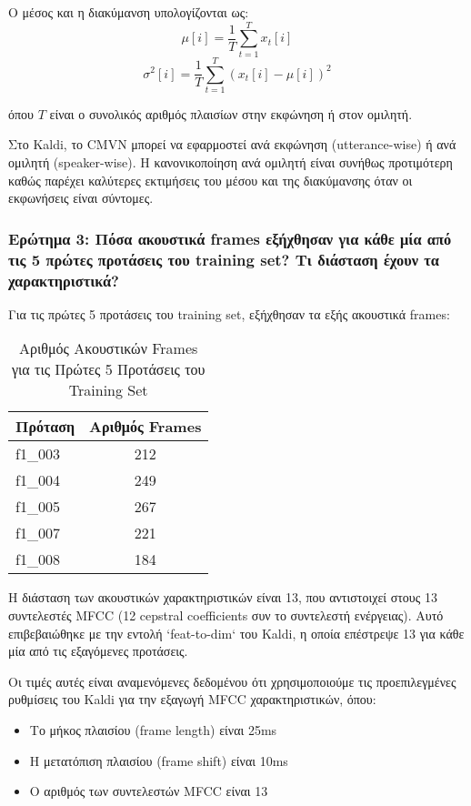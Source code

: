 \documentclass[a4paper,12pt]{article}
\begin{document}
Ο μέσος και η διακύμανση υπολογίζονται ως:
\begin{equation}
\mu[i] = \frac{1}{T} \sum_{t=1}^{T} x_t[i]
\end{equation}
\begin{equation}
\sigma^2[i] = \frac{1}{T} \sum_{t=1}^{T} (x_t[i] - \mu[i])^2
\end{equation}

όπου $T$ είναι ο συνολικός αριθμός πλαισίων στην εκφώνηση ή στον ομιλητή.

Στο Kaldi, το CMVN μπορεί να εφαρμοστεί ανά εκφώνηση (utterance-wise) ή ανά ομιλητή (speaker-wise). Η κανονικοποίηση ανά ομιλητή είναι συνήθως προτιμότερη καθώς παρέχει καλύτερες εκτιμήσεις του μέσου και της διακύμανσης όταν οι εκφωνήσεις είναι σύντομες.

\subsubsection*{Ερώτημα 3: Πόσα ακουστικά frames εξήχθησαν για κάθε μία από τις 5 πρώτες προτάσεις του training set? Τι διάσταση έχουν τα χαρακτηριστικά?}

Για τις πρώτες 5 προτάσεις του training set, εξήχθησαν τα εξής ακουστικά frames:

\begin{table}[h]
\centering
\caption{Αριθμός Ακουστικών Frames για τις Πρώτες 5 Προτάσεις του Training Set}
\label{tab:frames}
\begin{tabular}{@{}lc@{}}
\toprule
\textbf{Πρόταση} & \textbf{Αριθμός Frames} \\
\midrule
f1\_003 & 212 \\
f1\_004 & 249 \\
f1\_005 & 267 \\
f1\_007 & 221 \\
f1\_008 & 184 \\
\bottomrule
\end{tabular}
\end{table}

Η διάσταση των ακουστικών χαρακτηριστικών είναι 13, που αντιστοιχεί στους 13 συντελεστές MFCC (12 cepstral coefficients συν το συντελεστή ενέργειας). Αυτό επιβεβαιώθηκε με την εντολή `feat-to-dim` του Kaldi, η οποία επέστρεψε 13 για κάθε μία από τις εξαγόμενες προτάσεις.

Οι τιμές αυτές είναι αναμενόμενες δεδομένου ότι χρησιμοποιούμε τις προεπιλεγμένες ρυθμίσεις του Kaldi για την εξαγωγή MFCC χαρακτηριστικών, όπου:
\begin{itemize}
    \item Το μήκος πλαισίου (frame length) είναι 25ms
    \item Η μετατόπιση πλαισίου (frame shift) είναι 10ms
    \item Ο αριθμός των συντελεστών MFCC είναι 13
\end{itemize}
\end{document}
